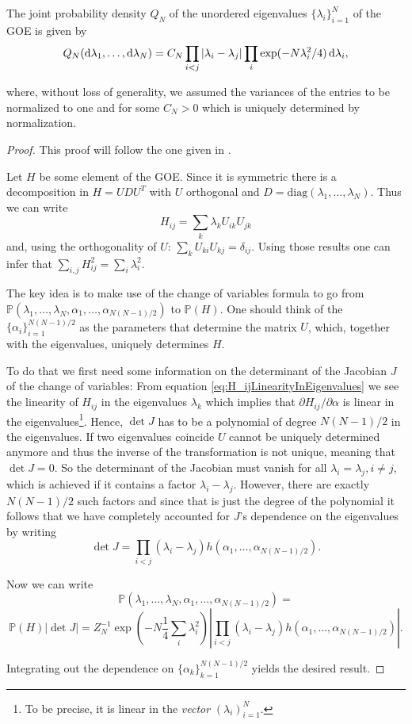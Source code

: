 \begin{theorem}\label{thm:probabilitydensityofEV}
	The joint probability density $Q_N$ of the unordered eigenvalues $\{\lambda_i\}_{i=1}^N$ of the GOE is given by
	$$Q_N(\mathop{}\!\mathrm{d}\lambda_1,\dots,\mathop{}\!\mathrm{d}\lambda_N) = C_N\prod_{i<j}|\lambda_i-\lambda_j|\prod_i\exp(-N\lambda_i^2/4)\mathop{}\!\mathrm{d}\lambda_i,$$
	
	where, without loss of generality, we assumed the variances of the entries to be normalized to one and for some $C_N>0$ which is uniquely determined by normalization.
\end{theorem}
\begin{proof}
	This proof will follow the one given in \cite{LiuEigenvalues}.
	
	Let $H$ be some element of the GOE. Since it is symmetric there is a decomposition in $H=UDU^T$ with $U$ orthogonal and $D=\text{diag}(\lambda_1,\dots,\lambda_N)$. Thus we can write 
	\begin{equation}\label{eq:H_ijLinearityInEigenvalues}
		H_{ij} = \sum_k \lambda_k U_{ik}U_{jk}
	\end{equation}
	and, using the orthogonality of $U$: $\sum_k U_{ki}U_{kj}=\delta_{ij}$. Using those results one can infer that $\sum_{i,j}H_{ij}^2=\sum_i \lambda_i^2$.
	
	The key idea is to make use of the change of variables formula to go from $\mathbb P(\lambda_1,\dots,\lambda_N,\alpha_1,\dots,\alpha_{N(N-1)/2})$ to $\mathbb P(H)$. One should think of the $\{\alpha_i\}_{i=1}^{N(N-1)/2}$ as the parameters that determine the matrix $U$, which, together with the eigenvalues, uniquely determines $H$.
	
	To do that we first need some information on the determinant of the Jacobian $J$ of the change of variables:
	From equation \ref{eq:H_ijLinearityInEigenvalues} we see the linearity of $H_{ij}$ in the eigenvalues $\lambda_k$ which implies that $\partial H_{ij}/\partial\alpha$ is linear in the eigenvalues\footnote{To be precise, it is linear in the \textit{vector} $(\lambda_i)_{i=1}^N$.}. Hence, $\det J$ has to be a polynomial of degree $N(N-1)/2$ in the eigenvalues. If two eigenvalues coincide $U$ cannot be uniquely determined anymore and thus the inverse of the transformation is not unique, meaning that $\det J=0$. So the determinant of the Jacobian must vanish for all $\lambda_i=\lambda_j, i\neq j$, which is achieved if it contains a factor $\lambda_i-\lambda_j$. However, there are exactly $N(N-1)/2$ such factors and since that is just the degree of the polynomial it follows that we have completely accounted for $J$'s dependence on the eigenvalues by writing $$\det J=\prod_{i<j}(\lambda_i-\lambda_j) h(\alpha_1,\dots,\alpha_{N(N-1)/2}).$$
	
	Now we can write
	$$\mathbb P(\lambda_1,\dots,\lambda_N,\alpha_1,\dots,\alpha_{N(N-1)/2}) = $$
	$$\mathbb P(H)|\det J|=Z_N^{-1}\exp\left(-N\frac{1}{4}\sum_i\lambda_i^2\right)|\prod_{i<j}(\lambda_i-\lambda_j) h(\alpha_1,\dots,\alpha_{N(N-1)/2})|.$$
	
	Integrating out the dependence on $\{\alpha_k\}_{k=1}^{N(N-1)/2}$ yields the desired result.
\end{proof}



